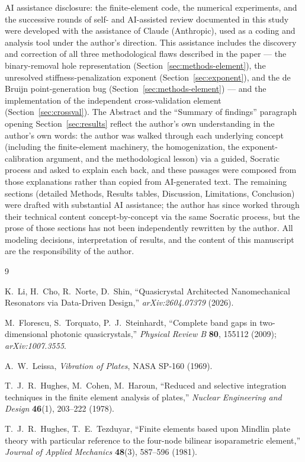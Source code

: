 \documentclass[11pt]{article}
\begin{document}
AI assistance disclosure: the finite-element code, the numerical experiments, and the successive rounds of self- and AI-assisted review documented in this study were developed with the assistance of Claude (Anthropic), used as a coding and analysis tool under the author's direction. This assistance includes the discovery and correction of all three methodological flaws described in the paper --- the binary-removal hole representation (Section~\ref{sec:methods-element}), the unresolved stiffness-penalization exponent (Section~\ref{sec:exponent}), and the de Bruijn point-generation bug (Section~\ref{sec:methods-element}) --- and the implementation of the independent cross-validation element (Section~\ref{sec:crossval}). The Abstract and the ``Summary of findings'' paragraph opening Section~\ref{sec:results} reflect the author's own understanding in the author's own words: the author was walked through each underlying concept (including the finite-element machinery, the homogenization, the exponent-calibration argument, and the methodological lesson) via a guided, Socratic process and asked to explain each back, and these passages were composed from those explanations rather than copied from AI-generated text. The remaining sections (detailed Methods, Results tables, Discussion, Limitations, Conclusion) were drafted with substantial AI assistance; the author has since worked through their technical content concept-by-concept via the same Socratic process, but the prose of those sections has not been independently rewritten by the author. All modeling decisions, interpretation of results, and the content of this manuscript are the responsibility of the author.

\begin{thebibliography}{9}

K.~Li, H.~Cho, R.~Norte, D.~Shin, ``Quasicrystal Architected Nanomechanical Resonators via Data-Driven Design,'' \textit{arXiv:2604.07379} (2026).

M.~Florescu, S.~Torquato, P.~J.~Steinhardt, ``Complete band gaps in two-dimensional photonic quasicrystals,'' \textit{Physical Review B} \textbf{80}, 155112 (2009); \textit{arXiv:1007.3555}.

A.~W.~Leissa, \textit{Vibration of Plates}, NASA SP-160 (1969).

T.~J.~R.~Hughes, M.~Cohen, M.~Haroun, ``Reduced and selective integration techniques in the finite element analysis of plates,'' \textit{Nuclear Engineering and Design} \textbf{46}(1), 203--222 (1978).

T.~J.~R.~Hughes, T.~E.~Tezduyar, ``Finite elements based upon Mindlin plate theory with particular reference to the four-node bilinear isoparametric element,'' \textit{Journal of Applied Mechanics} \textbf{48}(3), 587--596 (1981).

\end{thebibliography}
\end{document}
